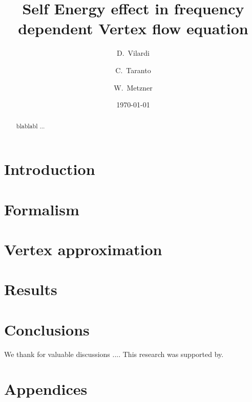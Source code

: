 \documentclass[aps,prb,twocolumn,showpacs,groupedaddress]{revtex4}
\begin{document}
\title{Self Energy effect in frequency dependent Vertex flow equation}

\author {D.~Vilardi}
\author{C.~Taranto}
\author{W.~Metzner}

\date{\today}

\begin{abstract}
blablabl ...
\end{abstract}

\pacs{}
\maketitle

\section{Introduction}
\label{sec:introduction}


\section{Formalism}
\label{sec:formalism}

\section{Vertex approximation}
\label{sec:vertex}


\section{Results}
\label{sec:results}


\section{Conclusions}
\label{sec:conclusions}


\begin{acknowledgments}
We thank  for valuable discussions .... This research was supported by.
\end{acknowledgments}

\section{Appendices}
\label{sec:appendices}




\end{document}

